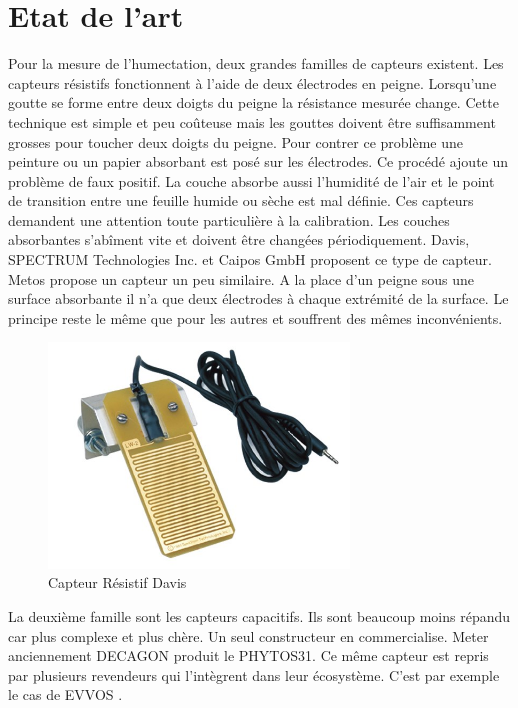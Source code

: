 \section{Etat de l'art}
\graphicspath{ {./figuresState} }

Pour la mesure de l'humectation, deux grandes familles de capteurs existent. Les capteurs résistifs fonctionnent à l'aide de deux électrodes en peigne. Lorsqu'une goutte se forme entre deux doigts du peigne la résistance mesurée change. Cette technique est simple et peu coûteuse mais les gouttes doivent être suffisamment grosses pour toucher deux doigts du peigne. Pour contrer ce problème une peinture ou un papier absorbant est posé sur les électrodes. Ce procédé ajoute un problème de faux positif. La couche absorbe aussi l'humidité de l'air et le point de transition entre une feuille humide ou sèche est mal définie. Ces capteurs demandent une attention toute particulière à la calibration. Les couches absorbantes s'abîment vite et doivent être changées périodiquement. Davis\cite{davis}, SPECTRUM Technologies Inc.\cite{spectrum} et Caipos GmbH \cite{caipos} proposent ce type de capteur. Metos propose un capteur un peu similaire. A la place d'un peigne sous une surface absorbante il n'a que deux électrodes à chaque extrémité de la surface. Le principe reste le même que pour les autres et souffrent des mêmes inconvénients.

\begin{figure}[!ht]
\centering
\includegraphics[width=8cm]{davis}
\caption{Capteur Résistif Davis \cite{davis}}
\end{figure}


La deuxième famille sont les capteurs capacitifs. Ils sont beaucoup moins répandu car plus complexe et plus chère. Un seul constructeur en commercialise. Meter \cite{meter} anciennement DECAGON produit le PHYTOS31. Ce même capteur est repris par plusieurs revendeurs qui l'intègrent dans leur écosystème. C'est par exemple le cas de EVVOS \cite{evvos}.



